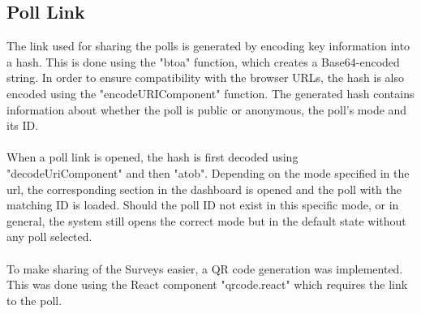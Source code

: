 \documentclass[a4paper,12pt]{report}
\begin{document}
\subsection{Poll Link}
The link used for sharing the polls is generated by encoding key information into a hash. This is done using the "btoa" function, which creates a Base64-encoded string. In order to ensure compatibility with the browser URLs, the hash is also encoded using the "encodeURIComponent" function. The generated hash contains information about whether the poll is public or anonymous, the poll's mode and its ID.\parencite{mdn-btoa}\parencite{mdn-encodeUriComponent}\\\\
When a poll link is opened, the hash is first decoded using "decodeUriComponent" and then "atob". Depending on the mode specified in the url, the corresponding section in the dashboard is opened and the poll with the matching ID is loaded. Should the poll ID not exist in this specific mode, or in general, the system still opens the correct mode but in the default state without any poll selected.\parencite{mdn-atob}\parencite{mdn-decodeUriComponent}\\\\
To make sharing of the Surveys easier, a QR code generation was implemented. This was done using the React component "qrcode.react" which requires the link to the poll.\parencite{qrcode}
\end{document}
